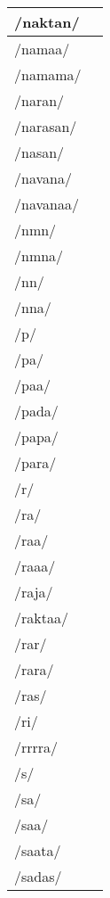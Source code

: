 \documentclass{article}
\begin{document}
\begin{longtable}{|l|p{}|}
/naktan/ & \textIndus{} \\ \hline
/namaa/ & \textIndus{} \\ \hline
/namama/ & \textIndus{} \\ \hline
/naran/ & \textIndus{} \\ \hline
/narasan/ & \textIndus{} \\ \hline
/nasan/ & \textIndus{} \\ \hline
/navana/ & \textIndus{} \\ \hline
/navanaa/ & \textIndus{} \\ \hline
/nmn/ & \textIndus{} \\ \hline
/nmna/ & \textIndus{} \\ \hline
/nn/ & \textIndus{} \\ \hline
/nna/ & \textIndus{} \\ \hline
/p/ & \textIndus{} \\ \hline
/pa/ & \textIndus{} \\ \hline
/paa/ & \textIndus{} \\ \hline
/pada/ & \textIndus{} \\ \hline
/papa/ & \textIndus{} \\ \hline
/para/ & \textIndus{} \\ \hline
/r/ & \textIndus{} \\ \hline
/ra/ & \textIndus{} \\ \hline
/raa/ & \textIndus{} \\ \hline
/raaa/ & \textIndus{} \\ \hline
/raja/ & \textIndus{} \\ \hline
/raktaa/ & \textIndus{} \\ \hline
/rar/ & \textIndus{} \\ \hline
/rara/ & \textIndus{} \\ \hline
/ras/ & \textIndus{} \\ \hline
/ri/ & \textIndus{} \\ \hline
/rrrra/ & \textIndus{} \\ \hline
/s/ & \textIndus{} \\ \hline
/sa/ & \textIndus{} \\ \hline
/saa/ & \textIndus{} \\ \hline
/saata/ & \textIndus{} \\ \hline
/sadas/ & \textIndus{} \\ \hline

\end{longtable}
\end{document}
